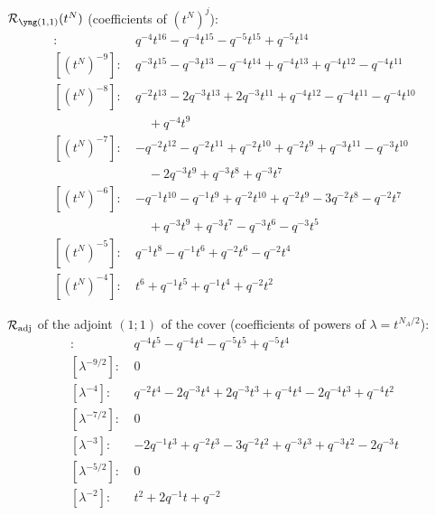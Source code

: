 $\Rred_{\yoneone}(t^N)$ (coefficients of $(t^N)^j$):
\begin{align*}
[(t^N)^{-10}]\colon\ & q^{-4} t^{16} -q^{-4} t^{15} -q^{-5} t^{15} +q^{-5} t^{14} \\
[(t^N)^{-9}]\colon\ & q^{-3} t^{15} -q^{-3} t^{13} -q^{-4} t^{14} +q^{-4} t^{13} +q^{-4} t^{12} -q^{-4} t^{11} \\
[(t^N)^{-8}]\colon\ & q^{-2} t^{13} -2 q^{-3} t^{13} +2 q^{-3} t^{11} +q^{-4} t^{12} -q^{-4} t^{11} -q^{-4} t^{10} \\
& \quad +q^{-4} t^{9} \\
[(t^N)^{-7}]\colon\ & -q^{-2} t^{12} -q^{-2} t^{11} +q^{-2} t^{10} +q^{-2} t^{9} +q^{-3} t^{11} -q^{-3} t^{10} \\
& \quad -2 q^{-3} t^{9} +q^{-3} t^{8} +q^{-3} t^{7} \\
[(t^N)^{-6}]\colon\ & -q^{-1} t^{10} -q^{-1} t^{9} +q^{-2} t^{10} +q^{-2} t^{9} -3 q^{-2} t^{8} -q^{-2} t^{7} \\
& \quad +q^{-3} t^{9} +q^{-3} t^{7} -q^{-3} t^{6} -q^{-3} t^{5} \\
[(t^N)^{-5}]\colon\ & q^{-1} t^{8} -q^{-1} t^{6} +q^{-2} t^{6} -q^{-2} t^{4} \\
[(t^N)^{-4}]\colon\ & t^{6} +q^{-1} t^{5} +q^{-1} t^{4} +q^{-2} t^{2}
\end{align*}

$\mathcal{R}_{\mathrm{adj}}$ of the adjoint $(1;1)$ of the cover (coefficients of powers of $\lambda = t^{N_A/2}$):
\begin{align*}
[\lambda^{-5}]\colon\ & q^{-4} t^{5} -q^{-4} t^{4} -q^{-5} t^{5} +q^{-5} t^{4} \\
[\lambda^{-9/2}]\colon\ & 0 \\
[\lambda^{-4}]\colon\ & q^{-2} t^{4} -2 q^{-3} t^{4} +2 q^{-3} t^{3} +q^{-4} t^{4} -2 q^{-4} t^{3} +q^{-4} t^{2} \\
[\lambda^{-7/2}]\colon\ & 0 \\
[\lambda^{-3}]\colon\ & -2 q^{-1} t^{3} +q^{-2} t^{3} -3 q^{-2} t^{2} +q^{-3} t^{3} +q^{-3} t^{2} -2 q^{-3} t \\
[\lambda^{-5/2}]\colon\ & 0 \\
[\lambda^{-2}]\colon\ & t^{2} +2 q^{-1} t +q^{-2}
\end{align*}
